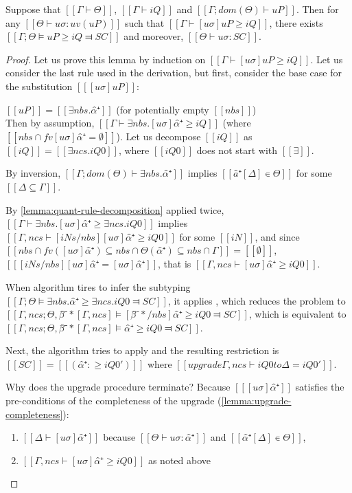 \begin{lemma} \label{lemma:pos-subt-completeness}
    Suppose that $[[Γ ⊢ Θ]]$, $[[Γ ⊢ iQ]]$ and $[[Γ ; dom(Θ) ⊢  uP]]$.
    Then for any $[[Θ ⊢ uσ : uv(uP)]]$ such that $[[ Γ ⊢ [uσ]uP ≥ iQ ]]$,
    there exists $[[Γ; Θ ⊨ uP ≥ iQ ⫤ SC]]$ and moreover, $[[ Θ ⊢ uσ : SC ]]$.
\end{lemma}
\begin{proof}
    Let us prove this lemma by induction on $[[ Γ ⊢ [uσ]uP ≥ iQ ]]$.
    Let us consider the last rule used in the derivation,
    but first, consider the base case for the substitution $[[ [uσ]uP ]]$:
    \begin{caseof}
        \item \label{case:pos-subt-complete-base} $[[uP]] = [[ ∃nbs.α̂⁺ ]]$ 
            (for potentially empty $[[nbs]]$)\\
            Then by assumption, $[[ Γ ⊢ ∃nbs.[uσ]α̂⁺ ≥ iQ ]]$ (where $[[ {nbs} ∩ fv [uσ]α̂⁺ = ∅]]$).
            Let us decompose $[[iQ]]$ as $[[iQ]] = [[∃ncs.iQ0]]$, where $[[iQ0]]$ does
            not start with $[[∃]]$. 

            By inversion, $[[Γ ; dom(Θ) ⊢  ∃nbs.α̂⁺]]$ implies $[[â⁺[Δ] ∊ Θ]]$ for some 
            $[[{Δ} ⊆ Γ]]$.

            By \cref{lemma:quant-rule-decomposition} applied twice, 
            $[[ Γ ⊢ ∃nbs.[uσ]α̂⁺ ≥ ∃ncs.iQ0 ]]$ implies
            $[[ Γ,ncs  ⊢ [iNs/nbs][uσ]α̂⁺ ≥ iQ0 ]]$ for some $[[iN]]$, 
            and since $[[ {nbs} ∩ fv([uσ]α̂⁺) ⊆ {nbs} ∩ {Θ(α̂⁺)} ⊆ {nbs} ∩ Γ]] = [[ ∅ ]]$,
            $[[ [iNs/nbs][uσ]α̂⁺ = [uσ]α̂⁺ ]]$, that is $[[ Γ,ncs ⊢ [uσ]α̂⁺ ≥ iQ0]]$.

            When algorithm tires to infer the subtyping 
            $[[Γ; Θ ⊨ ∃nbs.α̂⁺ ≥ ∃ncs.iQ0 ⫤ SC]]$,
            it applies ,
            which reduces the problem to
            $[[Γ, ncs; Θ, β̂⁻*[Γ, ncs] ⊨ [β̂⁻*/nbs] α̂⁺ ≥ iQ0 ⫤ SC]]$, 
            which is equivalent to 
            $[[Γ, ncs; Θ, β̂⁻*[Γ, ncs] ⊨ α̂⁺ ≥ iQ0 ⫤ SC]]$.

            Next, the algorithm tries to apply
            and the resulting restriction is $[[SC]] = [[(α̂⁺ :≥ iQ0')]]$ where
            $[[upgrade Γ, ncs ⊢ iQ0 to Δ = iQ0']]$.

            Why does the upgrade procedure terminate?
            Because $[[ [uσ]α̂⁺ ]]$ satisfies the pre-conditions of the completeness of the upgrade
            (\cref{lemma:upgrade-completeness}):
            \begin{enumerate}
                \item $[[Δ ⊢ [uσ]α̂⁺ ]]$ because $[[Θ ⊢ uσ : {α̂⁺}]]$ and $[[α̂⁺[Δ] ∊ Θ]]$,
                \item $[[ Γ,ncs ⊢ [uσ]α̂⁺ ≥ iQ0]]$ as noted above
            \end{enumerate}


\end{caseof}
\end{proof}
